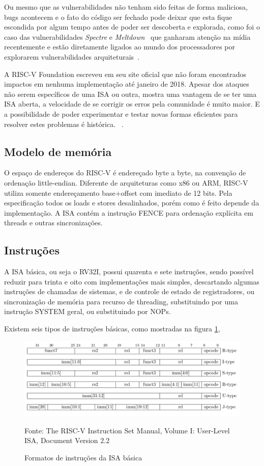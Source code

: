 		Ou mesmo que as vulnerabilidades não tenham sido feitas de forma maliciosa, bugs acontecem e o fato do código ser fechado pode deixar que esta fique escondida por algum tempo antes de poder ser descoberta e explorada, como foi o caso das vulnerabilidades \textit{Spectre} e \textit{Meltdown}~\cite{meltdown_spectre_exploits} que ganharam atenção na mídia recentemente e estão diretamente ligados ao mundo dos processadores por explorarem vulnerabilidades arquiteturais~\cite{meltdown_spectre_media}.

		A RISC-V Foundation escreveu em seu site oficial que não foram encontrados impactos em nenhuma implementação até janeiro de 2018. Apesar dos ataques não serem específicos de uma ISA ou outra, mostra uma vantagem de se ter uma ISA aberta, a velocidade de se corrigir os erros pela comunidade é muito maior. E a possibilidade de poder experimentar e testar novas formas eficientes para resolver estes problemas é histórica. ~\cite{riscv_security}.

	\subsection{Modelo de memória}
	
		O espaço de endereços do RISC-V é endereçado byte a byte, na convenção de ordenação little-endian. Diferente de arquiteturas como x86 ou ARM, RISC-V utiliza somente endereçamento base+offset com imediato de 12 bits. Pela especificação todos os loads e stores desalinhados, porém como é feito depende da implementação. A ISA contém a instrução FENCE para ordenação explícita em threads e outras sincronizações.

	\subsection{Instruções}

		A ISA básica, ou seja o RV32I, possui quarenta e sete instruções, sendo possível reduzir para trinta e oito com implementações mais simples, descartando algumas instruções de chamadas de sistemas, e de controle de estado de registradores, ou sincronização de memória para recurso de threading, substituindo por uma instrução SYSTEM geral, ou substituindo por NOPs.
	
		Existem seis tipos de instruções básicas, como mostradas na figura \ref{fig:instruction_formats},

		\begin{figure}[h]
		  \includegraphics[width=\linewidth]{img/instruction_formats.png}
		  \caption{Formatos de instruções da ISA básica}
		  Fonte: The RISC-V Instruction Set Manual, Volume I: User-Level ISA, Document Version 2.2~\cite{riscv_spec}
		  \label{fig:instruction_formats}
		\end{figure}

